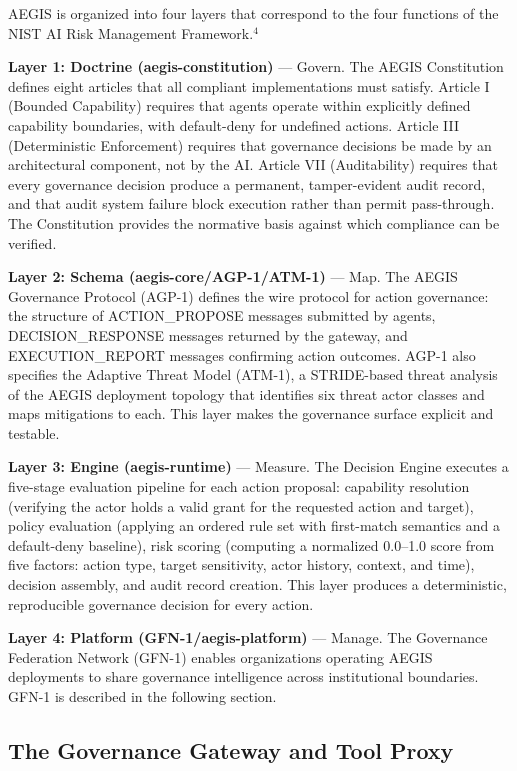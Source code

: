 \documentclass{IEEEcsmag}
\begin{document}
AEGIS is organized into four layers that correspond to the four functions of the NIST AI Risk Management Framework.$^{4}$

{\bf Layer 1: Doctrine (aegis-constitution)} --- Govern. The AEGIS Constitution defines eight articles that all compliant implementations must satisfy. Article I (Bounded Capability) requires that agents operate within explicitly defined capability boundaries, with default-deny for undefined actions. Article III (Deterministic Enforcement) requires that governance decisions be made by an architectural component, not by the AI. Article VII (Auditability) requires that every governance decision produce a permanent, tamper-evident audit record, and that audit system failure block execution rather than permit pass-through. The Constitution provides the normative basis against which compliance can be verified.

{\bf Layer 2: Schema (aegis-core/AGP-1/ATM-1)} --- Map. The AEGIS Governance Protocol (AGP-1) defines the wire protocol for action governance: the structure of ACTION\_PROPOSE messages submitted by agents, DECISION\_RESPONSE messages returned by the gateway, and EXECUTION\_REPORT messages confirming action outcomes. AGP-1 also specifies the Adaptive Threat Model (ATM-1), a STRIDE-based threat analysis of the AEGIS deployment topology that identifies six threat actor classes and maps mitigations to each. This layer makes the governance surface explicit and testable.

{\bf Layer 3: Engine (aegis-runtime)} --- Measure. The Decision Engine executes a five-stage evaluation pipeline for each action proposal: capability resolution (verifying the actor holds a valid grant for the requested action and target), policy evaluation (applying an ordered rule set with first-match semantics and a default-deny baseline), risk scoring (computing a normalized 0.0--1.0 score from five factors: action type, target sensitivity, actor history, context, and time), decision assembly, and audit record creation. This layer produces a deterministic, reproducible governance decision for every action.

{\bf Layer 4: Platform (GFN-1/aegis-platform)} --- Manage. The Governance Federation Network (GFN-1) enables organizations operating AEGIS deployments to share governance intelligence across institutional boundaries. GFN-1 is described in the following section.

\subsection{The Governance Gateway and Tool Proxy}
\end{document}
